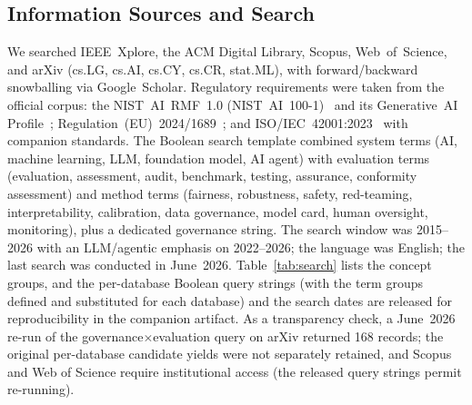 \subsection{Information Sources and Search}
We searched IEEE~Xplore, the ACM Digital Library, Scopus, Web~of~Science, and arXiv
(cs.LG, cs.AI, cs.CY, cs.CR, stat.ML), with forward/backward snowballing via
Google~Scholar. Regulatory requirements were taken from the official corpus: the
NIST~AI~RMF~1.0 (NIST~AI~100-1)~\cite{nist2023airmf} and its Generative~AI
Profile~\cite{nist2024genai}; Regulation~(EU)~2024/1689~\cite{euaiact2024}; and
ISO/IEC~42001:2023~\cite{iso42001} with companion standards. The Boolean search template
combined system terms (AI, machine learning, LLM, foundation model, AI agent) with
evaluation terms (evaluation, assessment, audit, benchmark, testing, assurance, conformity
assessment) and method terms (fairness, robustness, safety, red-teaming, interpretability,
calibration, data governance, model card, human oversight, monitoring), plus a dedicated
governance string. The search window was 2015--2026 with an LLM/agentic emphasis on
2022--2026; the language was English; the last search was conducted in June~2026.
Table~\ref{tab:search} lists the concept groups, and the per-database Boolean query
strings (with the term groups defined and substituted for each database) and the search
dates are released for reproducibility in the companion artifact. As a transparency check, a
June~2026 re-run of the governance$\times$evaluation query on arXiv returned 168 records; the
original per-database candidate yields were not separately retained, and Scopus and Web of
Science require institutional access (the released query strings permit re-running).

